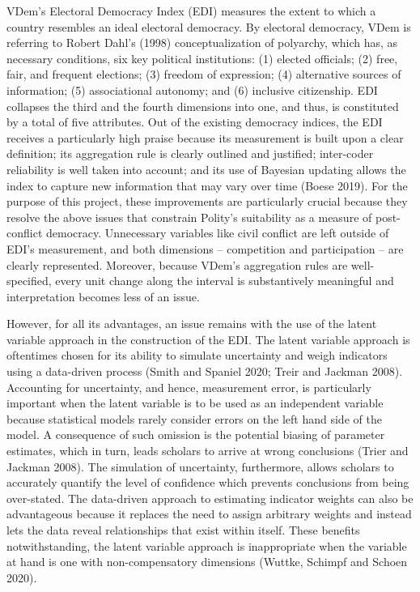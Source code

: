 \documentclass [11pt]{article}
\begin{document}
VDem's Electoral Democracy Index (EDI) measures the extent to which a country resembles an ideal electoral democracy. By electoral democracy, VDem is referring to Robert Dahl's (1998) conceptualization of polyarchy, which has, as necessary conditions, six key political institutions: (1) elected officials; (2) free, fair, and frequent elections; (3) freedom of expression; (4) alternative sources of information; (5) associational autonomy; and (6) inclusive citizenship. EDI collapses the third and the fourth dimensions into one, and thus, is constituted by a total of five attributes. Out of the existing democracy indices, the EDI receives a particularly high praise because its measurement is built upon a clear definition; its aggregation rule is clearly outlined and justified; inter-coder reliability is well taken into account; and its use of Bayesian updating allows the index to capture new information that may vary over time (Boese 2019). For the purpose of this project, these improvements are particularly crucial because they resolve the above issues that constrain Polity's suitability as a measure of post-conflict democracy. Unnecessary variables like civil conflict are left outside of EDI's measurement, and both dimensions -- competition and participation -- are clearly represented. Moreover, because VDem's aggregation rules are well-specified, every unit change along the interval is substantively meaningful and interpretation becomes less of an issue.

However, for all its advantages, an issue remains with the use of the latent variable approach in the construction of the EDI. The latent variable approach is oftentimes chosen for its ability to simulate uncertainty and weigh indicators using a data-driven process (Smith and Spaniel 2020; Treir and Jackman 2008). Accounting for uncertainty, and hence, measurement error, is particularly important when the latent variable is to be used as an independent variable because statistical models rarely consider errors on the left hand side of the model. A consequence of such omission is the potential biasing of parameter estimates, which in turn, leads scholars to arrive at wrong conclusions (Trier and Jackman 2008). The simulation of uncertainty, furthermore, allows scholars to accurately quantify the level of confidence which prevents conclusions from being over-stated. The data-driven approach to estimating indicator weights can also be advantageous because it replaces the need to assign arbitrary weights and instead lets the data reveal relationships that exist within itself. These benefits notwithstanding, the latent variable approach is inappropriate when the variable at hand is one with non-compensatory dimensions (Wuttke, Schimpf and Schoen 2020).
\end{document}
